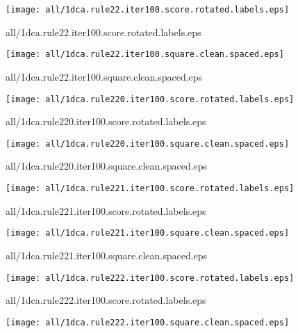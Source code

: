 \documentclass{article}
\begin{document}
\begin{center}
\begin{minipage}{\textwidth}
\texttt{[image: all/1dca.rule22.iter100.score.rotated.labels.eps]}
\end{minipage}
\end{center}
{\footnotesize all/1dca.rule22.iter100.score.rotated.labels.eps}
\begin{center}
\begin{minipage}{\textwidth}
\texttt{[image: all/1dca.rule22.iter100.square.clean.spaced.eps]}
\end{minipage}
\end{center}
{\footnotesize all/1dca.rule22.iter100.square.clean.spaced.eps}
\begin{center}
\begin{minipage}{\textwidth}
\texttt{[image: all/1dca.rule220.iter100.score.rotated.labels.eps]}
\end{minipage}
\end{center}
{\footnotesize all/1dca.rule220.iter100.score.rotated.labels.eps}
\begin{center}
\begin{minipage}{\textwidth}
\texttt{[image: all/1dca.rule220.iter100.square.clean.spaced.eps]}
\end{minipage}
\end{center}
{\footnotesize all/1dca.rule220.iter100.square.clean.spaced.eps}
\begin{center}
\begin{minipage}{\textwidth}
\texttt{[image: all/1dca.rule221.iter100.score.rotated.labels.eps]}
\end{minipage}
\end{center}
{\footnotesize all/1dca.rule221.iter100.score.rotated.labels.eps}
\begin{center}
\begin{minipage}{\textwidth}
\texttt{[image: all/1dca.rule221.iter100.square.clean.spaced.eps]}
\end{minipage}
\end{center}
{\footnotesize all/1dca.rule221.iter100.square.clean.spaced.eps}
\begin{center}
\begin{minipage}{\textwidth}
\texttt{[image: all/1dca.rule222.iter100.score.rotated.labels.eps]}
\end{minipage}
\end{center}
{\footnotesize all/1dca.rule222.iter100.score.rotated.labels.eps}
\begin{center}
\begin{minipage}{\textwidth}
\texttt{[image: all/1dca.rule222.iter100.square.clean.spaced.eps]}
\end{minipage}
\end{center}
\end{document}
